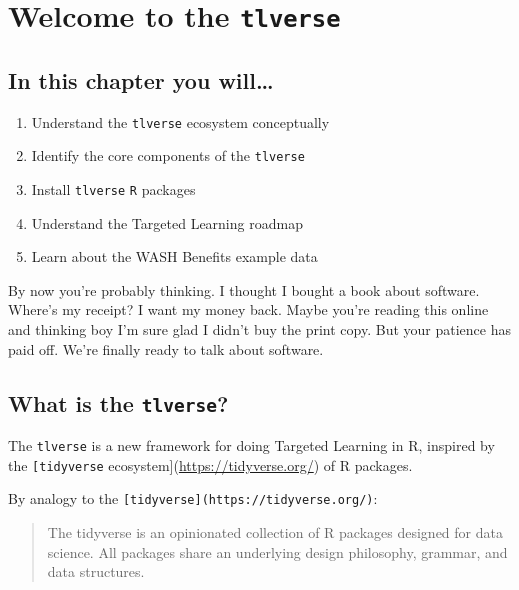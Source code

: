 \documentclass[
  12pt, krantz2,
]{krantz}
\newcommand{\passthrough}[1]{#1}
\providecommand{\tightlist}{%
  \setlength{\itemsep}{0pt}\setlength{\parskip}{0pt}}
\theoremstyle{definition}
\theoremstyle{definition}
\theoremstyle{definition}
\newcommand{\1}{\mathbbm{1}}
\begin{document}
\hypertarget{tlverse}{%
\chapter{\texorpdfstring{Welcome to the \texttt{tlverse}}{Welcome to the tlverse}}\label{tlverse}}

\hypertarget{in-this-chapter-you-will}{%
\section{In this chapter you will\ldots{}}\label{in-this-chapter-you-will}}

\begin{enumerate}
\def\labelenumi{\arabic{enumi}.}
\tightlist
\item
  Understand the \passthrough{\lstinline!tlverse!} ecosystem conceptually
\item
  Identify the core components of the \passthrough{\lstinline!tlverse!}
\item
  Install \passthrough{\lstinline!tlverse!} \passthrough{\lstinline!R!} packages
\item
  Understand the Targeted Learning roadmap
\item
  Learn about the WASH Benefits example data
\end{enumerate}

By now you're probably thinking. I thought I bought a book about software. Where's my receipt? I want my money back. Maybe you're reading this online and thinking boy I'm sure glad I didn't buy the print copy. But your patience has paid off. We're finally ready to talk about software.

\hypertarget{what-is-the-tlverse}{%
\section{\texorpdfstring{What is the \texttt{tlverse}?}{What is the tlverse?}}\label{what-is-the-tlverse}}

The \passthrough{\lstinline!tlverse!} is a new framework for doing Targeted Learning in R, inspired by the \passthrough{\lstinline![tidyverse!} ecosystem{]}(\url{https://tidyverse.org/}) of R packages.

By analogy to the \passthrough{\lstinline![tidyverse](https://tidyverse.org/)!}:

\begin{quote}
The tidyverse is an opinionated collection of R packages designed for data science. All packages share an underlying design philosophy, grammar, and data structures.
\end{quote}
\end{document}
